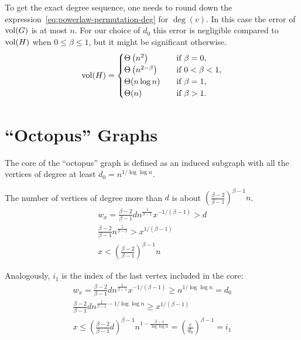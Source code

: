 To get the exact degree sequence, one needs to round down
the expression~\eqref{eq:powerlaw-permutation-deg} for $\deg(v)$.
In this case the error of $\operatorname*{vol}(G)$ is at most $n$.
For our choice of $d_0$ this error is negligible compared to $\operatorname*{vol}(H)$
when $0\leq\beta\leq1$, but it might be significant otherwise.
\begin{equation}
    \operatorname*{vol}(H)=
    \begin{cases}
        \Theta\left(n^2\right) & \quad \text{if } \beta=0,\\
        \Theta\left(n^{2-\beta}\right) & \quad \text{if } 0<\beta<1,\\
        \Theta(n \log n) & \quad \text{if } \beta=1,\\
        \Theta(n) & \quad \text{if } \beta>1.
    \end{cases}
\end{equation}

\section{\texorpdfstring{``Octopus''}{"Octopus"} Graphs}

The core of the ``octopus'' graph is defined as an induced subgraph
with all the vertices of degree at least $d_0=n^{1/\log\log n}$.



The number of vertices of degree more than $d$
is about $\left(\frac{\beta-2}{\beta-1}\right)^{\beta-1}n$.
\begin{gather*}
    w_x=\frac{\beta-2}{\beta-1}dn^{\frac{1}{\beta-1}}x^{-1/(\beta-1)}>d\\
    \frac{\beta-2}{\beta-1}n^{\frac{1}{\beta-1}}>x^{1/(\beta-1)}\\
    x<\left(\frac{\beta-2}{\beta-1}\right)^{\beta-1}n
\end{gather*}

Analogously, $i_1$ is the index of the last vertex included in the core:
\begin{gather*}
    w_x=\frac{\beta-2}{\beta-1}dn^{\frac{1}{\beta-1}}x^{-1/(\beta-1)}\geq n^{1/\log\log n}=d_0\\
    \frac{\beta-2}{\beta-1}dn^{\frac{1}{\beta-1}-1/\log\log n}\geq x^{1/(\beta-1)}\\
    x\leq\left(\frac{\beta-2}{\beta-1}d\right)^{\beta-1}n^{1-\frac{\beta-1}{\log\log n}}=\left(\frac{c}{d_0}\right)^{\beta-1}=i_1
\end{gather*}

